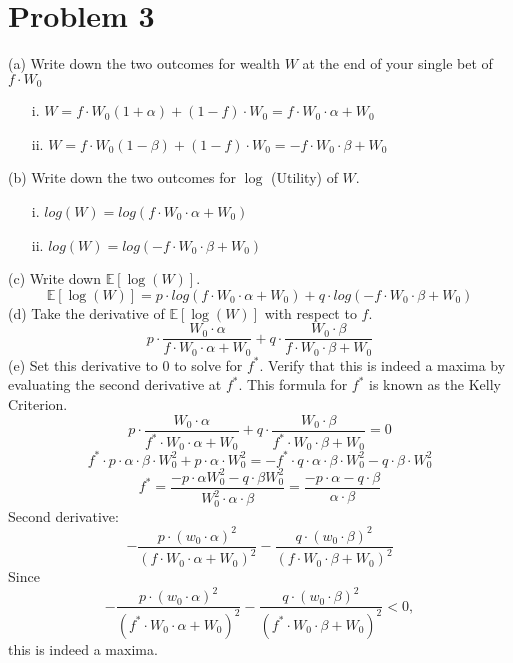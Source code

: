 \documentclass{article}
\begin{document}
\section*{Problem 3}
(a) Write down the two outcomes for wealth $W$ at the end of your single bet of $f \cdot W_{0}$
\begin{itemize}
\item[i.] $W=f\cdot W_0 (1+\alpha) + (1-f)\cdot W_0 = f\cdot W_0 \cdot \alpha + W_0$
\item[ii.] $W=f\cdot W_0 (1-\beta) + (1-f)\cdot W_0 = - f\cdot W_0 \cdot \beta + W_0$
\end{itemize}
(b) Write down the two outcomes for $\log$ (Utility) of $W$.
\begin{itemize}
\item[i.] $log(W) =log(f\cdot W_0 \cdot \alpha + W_0)$
\item[ii.] $log(W)=log(-f\cdot W_0 \cdot \beta + W_0)$
\end{itemize}
(c) Write down $\mathbb{E}[\log (W)]$.
$$\mathbb{E}[\log (W)] = p\cdot log(f\cdot W_0 \cdot \alpha + W_0) + q \cdot log(-f\cdot W_0 \cdot \beta + W_0)$$
(d) Take the derivative of $\mathbb{E}[\log (W)]$ with respect to $f$.\\
$$ p \cdot \frac{W_0 \cdot \alpha}{f\cdot W_0 \cdot \alpha + W_0} + q \cdot \frac{W_0 \cdot \beta}{f\cdot W_0 \cdot \beta + W_0}$$
(e) Set this derivative to 0 to solve for $f^{*}$. Verify that this is indeed a maxima by evaluating the second derivative at $f^{*}$. This formula for $f^{*}$ is known as the Kelly Criterion.\\
$$ p \cdot \frac{W_0 \cdot \alpha}{f^*\cdot W_0 \cdot \alpha + W_0} + q \cdot \frac{W_0 \cdot \beta}{f^*\cdot W_0 \cdot \beta + W_0} = 0$$
$$ f^*\cdot p \cdot\alpha \cdot \beta \cdot W_{0}^{2} + p \cdot  \alpha \cdot W_{0}^{2} = -f^* \cdot q  \cdot \alpha \cdot \beta \cdot W_{0}^{2} - q \cdot \beta \cdot W_{0}^{2} $$
$$f^* = \frac{-p \cdot \alpha W_{0}^{2}-q\cdot \beta W_{0}^{2}}{W_{0}^{2}\cdot \alpha \cdot \beta} = \frac{-p \cdot \alpha -q\cdot \beta }{\alpha \cdot \beta}$$
Second derivative:
$$-\frac{p\cdot (w_0\cdot\alpha)^2}{(f\cdot W_0 \cdot \alpha+W_0)^2}-\frac{q\cdot (w_0\cdot\beta)^2}{(f\cdot W_0 \cdot \beta+W_0)^2}$$
Since
$$-\frac{p\cdot (w_0\cdot\alpha)^2}{(f^{*}\cdot W_0 \cdot \alpha+W_0)^2}-\frac{q\cdot (w_0\cdot\beta)^2}{(f^{*}\cdot W_0 \cdot \beta+W_0)^2} < 0,$$
this is indeed a maxima.
\end{document}
